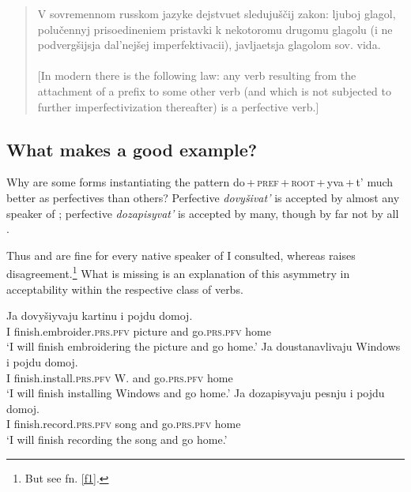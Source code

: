 \documentclass[output=paper,
colorlinks,
citecolor=brown,
newtxmath
]{langscibook}
\begin{document}
\begin{quote}
    V sovremennom russkom jazyke dejstvuet sledujuščij zakon: ljuboj glagol, polučennyj prisoedineniem pristavki k nekotoromu drugomu glagolu (i ne podvergšijsja dal'nejšej imperfektivacii), javljaetsja glagolom sov. vida.\\ \null\hfill\citep[67]{Zaliznjak.Smelev1997}\smallskip\\
    $[$In modern  there is the following law: any verb resulting from the attachment of a prefix to some other verb (and which is not subjected to further imperfectivization thereafter) is a perfective verb.$]$
\end{quote}


\subsection{What makes a good example?}

Why are some forms instantiating the pattern do\,+\,\textsc{pref}\,+\,\textsc{root}\,+\,yva\,+\,t' much better as perfectives than others? Perfective \textit{dovyšivat'} is accepted by almost any speaker of ; perfective \textit{dozapisyvat'} is accepted by many, though by far not by all
\citep[see][16--17]{Zinova2016}.

Thus  and  are fine for every native speaker of  I consulted, whereas  raises disagreement.\footnote{\label{f2}But see fn. \ref{f1}.} What is missing is an explanation of this asymmetry in acceptability within the respective class of verbs.

\ea\label{Zin6}
\gll Ja dovyšiyvaju kartinu i pojdu domoj.\\
I {finish.embroider.}\textsc{prs.pfv} picture and go.\textsc{prs.pfv} home\\
\glt `I will finish embroidering the picture and go home.'
\ex\label{ustanav}
\gll Ja doustanavlivaju Windows i pojdu domoj.\\
I {finish.install.}\textsc{prs.pfv} W. and go.\textsc{prs.pfv} home\\
\glt `I will finish installing Windows and go home.'
\ex\label{Zin5}
\gll Ja dozapisyvaju pesnju i pojdu domoj.\\
I {finish.record.}\textsc{prs.pfv} song and go.\textsc{prs.pfv} home\\
\glt `I will finish recording the song and go home.'
\z
\end{document}
